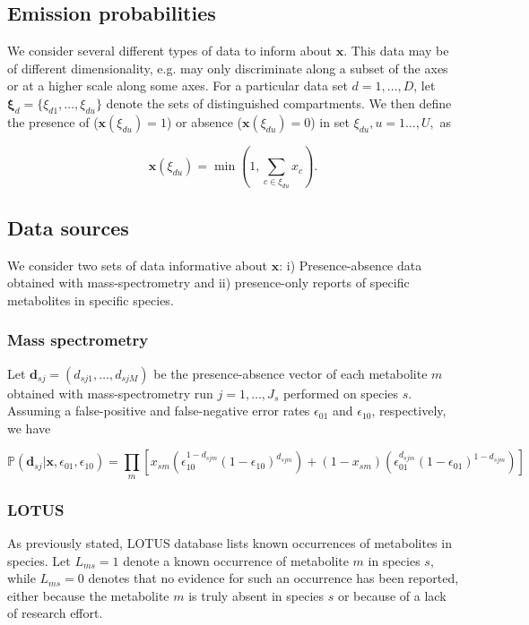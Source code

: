 \documentclass[
11pt, %
oneside, %
english, %
singlespacing, %
headsepline, %
chapterinoneline, %
]{MastersDoctoralThesis} %
\def\P{\mathbb{P}}
\def\x{\boldsymbol{x}}
\def\bxi{\boldsymbol{\xi}}
\def\bd{\boldsymbol{d}}
\begin{document}
	\subsection{Emission probabilities}\label{subsec:emission probabilities}
	We consider several different types of data to inform about $\x$. This data may be of different dimensionality, e.g. may only discriminate along a subset of the axes or at a higher scale along some axes. For a particular data set $d=1, \ldots, D$, let $\bxi_d=\{\xi_{d1}, \ldots, \xi_{du}\}$ denote the sets of distinguished compartments. We then define the presence of ($\x(\xi_{du})=1$) or absence ($\x(\xi_{du})=0$) in set $\xi_{du}, u=1\ldots,U,$ as
	
	\begin{equation}
		\x(\xi_{du}) = \min \left(1, \sum_{c \in \xi_{du}} x_c \right).
	\end{equation}

	\subsection{Data sources}\label{subsec: data sources}
	We consider two sets of data informative about $\x$: i) Presence-absence data obtained with mass-spectrometry and ii) presence-only reports of specific metabolites in specific species.
	
	\subsubsection{Mass spectrometry}
	 Let $\bd _{sj}=(d_{sj1}, \ldots, d_{sjM})$ be the presence-absence vector of each metabolite $m$ obtained with mass-spectrometry run $j=1,\ldots,J_s$ performed on species $s$. Assuming a false-positive and false-negative error rates $\epsilon_{01}$ and $\epsilon_{10}$, respectively, we have
	
	\begin{equation}\label{eq:mass spec error rate}
		\P(\bd_{sj}|\x, \epsilon_{01}, \epsilon_{10}) = \prod_m \left[ x_{sm}\left(\epsilon_{10}^{1-d_{sjm}}(1-\epsilon_{10})^{d_{sjm}}\right) + (1-x_{sm})\left( \epsilon_{01}^{d_{sjm}}(1-\epsilon_{01})^{1-d_{sjm}}\right)\right]
	\end{equation}
	\subsubsection{LOTUS}
	
	As previously stated, LOTUS database \cite{rutzLOTUSInitiativeOpen2022} lists known occurrences of metabolites in species. Let $L_{ms} = 1$ denote a known occurrence of metabolite $m$ in species $s$, while $L_{ms}=0$ denotes that no evidence for such an occurrence has been reported, either because the metabolite $m$ is truly absent in species $s$ or because of a lack of research effort.
	
\end{document}
